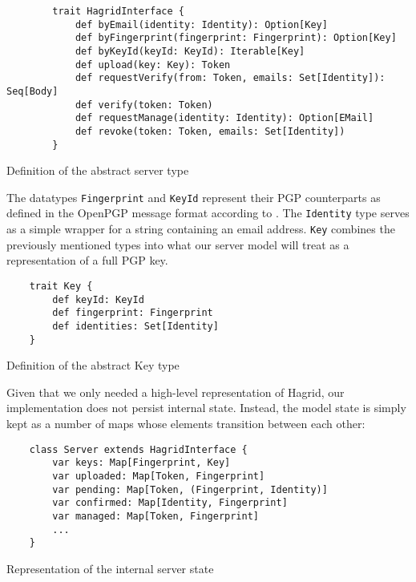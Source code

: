 \begin{code}
    \begin{verbatim}
        trait HagridInterface {
            def byEmail(identity: Identity): Option[Key]
            def byFingerprint(fingerprint: Fingerprint): Option[Key]
            def byKeyId(keyId: KeyId): Iterable[Key]
            def upload(key: Key): Token
            def requestVerify(from: Token, emails: Set[Identity]): Seq[Body]
            def verify(token: Token)
            def requestManage(identity: Identity): Option[EMail]
            def revoke(token: Token, emails: Set[Identity])
        }
        \end{verbatim}
        \caption{Definition of the abstract server type}
        \label{def:HagridInterface}
\end{code}

The datatypes \texttt{Fingerprint} and \texttt{KeyId} represent their PGP counterparts as defined in the OpenPGP message format according to \cite{callas1998openpgp}. The \texttt{Identity} type serves as a simple wrapper for a string containing an email address. \texttt{Key} combines the previously mentioned types into what our server model will treat as a representation of a full PGP key.
\begin{code}
    \begin{verbatim}
    trait Key {
        def keyId: KeyId
        def fingerprint: Fingerprint
        def identities: Set[Identity]
    }
    \end{verbatim}
\caption{Definition of the abstract Key type}
\end{code}

Given that we only needed a high-level representation of Hagrid, our implementation does not persist internal state. Instead, the model state is simply kept as a number of maps whose elements transition between each other: 
\begin{code}
    \begin{verbatim}
    class Server extends HagridInterface {
        var keys: Map[Fingerprint, Key]
        var uploaded: Map[Token, Fingerprint]
        var pending: Map[Token, (Fingerprint, Identity)]
        var confirmed: Map[Identity, Fingerprint]
        var managed: Map[Token, Fingerprint]
        ...
    }
    \end{verbatim} 
    \caption{Representation of the internal server state}
\end{code}


